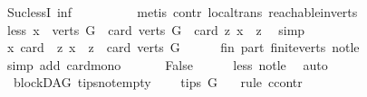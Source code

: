 \begin{isabellebody}
\ Suc{\isacharunderscore}{\kern0pt}lessI\ inf\isanewline
\ \ \ \ \ \ \ \ \isamarkupfalse%
\ {\isacharparenleft}{\kern0pt}metis\ contr\ local{\isachardot}{\kern0pt}trans\ reachable{}{\isacharunderscore}{\kern0pt}in{\isacharunderscore}{\kern0pt}verts{\isacharparenleft}{\kern0pt}{}{\isacharparenright}{\kern0pt}{\isacharparenright}{\kern0pt}\ \isanewline
\ \ \ \ \isamarkupfalse%
\isanewline
\ \ \isamarkupfalse%
\isanewline
\ \ \isamarkupfalse%
\ \isamarkupfalse%
\ less{\isacharcolon}{\kern0pt}\ {\isachardoublequoteopen}{\isasymexists}x\ {\isasymin}\ verts\ G{\isachardot}{\kern0pt}\ \ card\ {\isacharparenleft}{\kern0pt}verts\ G{\isacharparenright}{\kern0pt}\ {\isacharless}{\kern0pt}\ card\ {\isacharbraceleft}{\kern0pt}z{\isachardot}{\kern0pt}\ x\ {\isasymrightarrow}\isactrlsup {\isacharplus}{\kern0pt}\ z{\isacharbraceright}{\kern0pt}{\isachardoublequoteclose}\ \isamarkupfalse%
\ simp\isanewline
\ \ \isamarkupfalse%
\ {\isachardoublequoteopen}{\isasymforall}x{\isachardot}{\kern0pt}\ card\ \ {\isacharbraceleft}{\kern0pt}z{\isachardot}{\kern0pt}\ x\ {\isasymrightarrow}\isactrlsup {\isacharplus}{\kern0pt}\ z{\isacharbraceright}{\kern0pt}\ {\isasymle}\ card\ {\isacharparenleft}{\kern0pt}verts\ G{\isacharparenright}{\kern0pt}{\isachardoublequoteclose}\isanewline
\ \ \ \ \isamarkupfalse%
\ fin\ part\ finite{\isacharunderscore}{\kern0pt}verts\ not{\isacharunderscore}{\kern0pt}le\isanewline
\ \ \ \ \isamarkupfalse%
\ {\isacharparenleft}{\kern0pt}simp\ add{\isacharcolon}{\kern0pt}\ card{\isacharunderscore}{\kern0pt}mono{\isacharparenright}{\kern0pt}\ \isanewline
\ \ \isamarkupfalse%
\ \isamarkupfalse%
\ False\isanewline
\ \ \ \ \isamarkupfalse%
\ less\ not{\isacharunderscore}{\kern0pt}le\ \isamarkupfalse%
\ auto\isanewline
{}\isamarkupfalse%
%
\endisatagproof
{\isafoldproof}%
%
\isadelimproof
\isanewline
%
\endisadelimproof
\isanewline
{}\isamarkupfalse%
\ {\isacharparenleft}{\kern0pt}\ blockDAG{\isacharparenright}{\kern0pt}\ tips{\isacharunderscore}{\kern0pt}not{\isacharunderscore}{\kern0pt}empty{\isacharcolon}{\kern0pt}\ \isanewline
\ \ \ {\isachardoublequoteopen}tips\ G\ {\isasymnoteq}\ {\isacharbraceleft}{\kern0pt}{\isacharbraceright}{\kern0pt}{\isachardoublequoteclose}\ \isanewline
%
\isadelimproof
%
\endisadelimproof
%
\isatagproof
{}\isamarkupfalse%
{\isacharparenleft}{\kern0pt}rule\ ccontr{\isacharparenright}{\kern0pt}\isanewline

\end{isabellebody}
